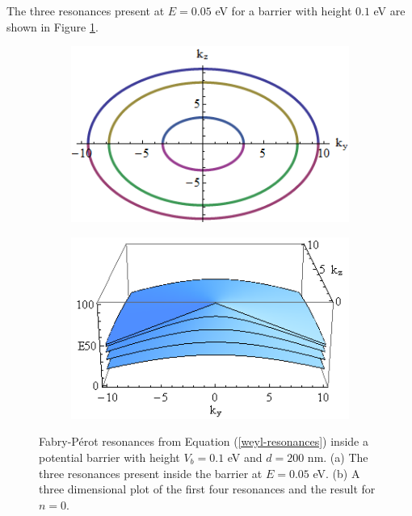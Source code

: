 			The three resonances present at $E=0.05$ eV for a barrier with height $0.1$ eV are shown in Figure \ref{weyl-res-1}.
			\begin{figure}[h]
				 \begin{subfigure}[h]{0.5\textwidth}
					\centerline{\includegraphics[scale=0.5]{images/weyl-res-1}}
					\caption{}
				\end{subfigure}
				\hspace{0.5cm}
				\begin{subfigure}[h]{0.5\textwidth}
					\centerline{\includegraphics[scale=0.5]{images/weyl-res-2}}
					\caption{}
				\end{subfigure}
				\caption{Fabry-P\'{e}rot resonances from Equation (\ref{weyl-resonances}) inside a potential barrier with height $V_{b}=0.1$ eV and $d=200$ nm. (a) The three resonances present inside the barrier at $E=0.05$ eV. (b) A three dimensional plot of the first four resonances and the result for $n=0$.}
				\label{weyl-res-1}
			\end{figure}

